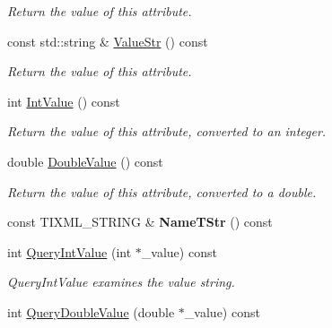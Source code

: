 \begin{DoxyCompactItemize}
\begin{DoxyCompactList}\small\item\em Return the value of this attribute. \end{DoxyCompactList}\item 
const std\+::string \& \hyperlink{class_ti_xml_attribute_a87705c3ccf9ee9417beb4f7cbacd4d33}{Value\+Str} () const \hypertarget{class_ti_xml_attribute_a87705c3ccf9ee9417beb4f7cbacd4d33}{}\label{class_ti_xml_attribute_a87705c3ccf9ee9417beb4f7cbacd4d33}

\begin{DoxyCompactList}\small\item\em Return the value of this attribute. \end{DoxyCompactList}\item 
int \hyperlink{class_ti_xml_attribute_aa1a20ad59dc7e89a0ab265396360d50f}{Int\+Value} () const \hypertarget{class_ti_xml_attribute_aa1a20ad59dc7e89a0ab265396360d50f}{}\label{class_ti_xml_attribute_aa1a20ad59dc7e89a0ab265396360d50f}

\begin{DoxyCompactList}\small\item\em Return the value of this attribute, converted to an integer. \end{DoxyCompactList}\item 
double \hyperlink{class_ti_xml_attribute_a2880ddef53fc7522c99535273954d230}{Double\+Value} () const \hypertarget{class_ti_xml_attribute_a2880ddef53fc7522c99535273954d230}{}\label{class_ti_xml_attribute_a2880ddef53fc7522c99535273954d230}

\begin{DoxyCompactList}\small\item\em Return the value of this attribute, converted to a double. \end{DoxyCompactList}\item 
const T\+I\+X\+M\+L\+\_\+\+S\+T\+R\+I\+NG \& {\bfseries Name\+T\+Str} () const \hypertarget{class_ti_xml_attribute_a64cee17bceb8232eb0736d26dd082d79}{}\label{class_ti_xml_attribute_a64cee17bceb8232eb0736d26dd082d79}

\item 
int \hyperlink{class_ti_xml_attribute_ad6c93088ee21af41a107931223339344}{Query\+Int\+Value} (int $\ast$\+\_\+value) const 
\begin{DoxyCompactList}\small\item\em Query\+Int\+Value examines the value string. \end{DoxyCompactList}\item 
int \hyperlink{class_ti_xml_attribute_ac87b2a8489906a5d7aa2875f20be3513}{Query\+Double\+Value} (double $\ast$\+\_\+value) const \hypertarget{class_ti_xml_attribute_ac87b2a8489906a5d7aa2875f20be3513}{}\label{class_ti_xml_attribute_ac87b2a8489906a5d7aa2875f20be3513}


\end{DoxyCompactItemize}
